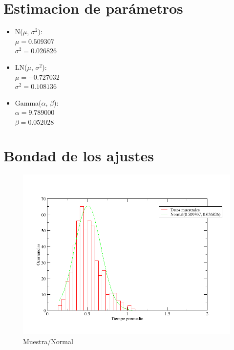 \documentclass[10pt,a4paper]{article}
\begin{document}
\section{Estimacion de par\'ametros}

\begin{itemize}
  \item N($\mu$, $\sigma^{2}$): \\
    $\mu = 0.509307$ \\
    $\sigma^{2} = 0.026826$
  \item LN($\mu$, $\sigma^{2}$): \\
    $\mu = -0.727032$ \\
    $\sigma^{2} = 0.108136$
  \item Gamma($\alpha$, $\beta$): \\
    $\alpha = 9.789000$ \\
    $\beta = 0.052028$
\end{itemize}

\section{Bondad de los ajustes}



\begin{figure}
  \centering
  \includegraphics[scale=0.5]{freq-normal.png} 
  \caption{Muestra/Normal}
  \label{freq-normal}
\end{figure}
\end{document}
